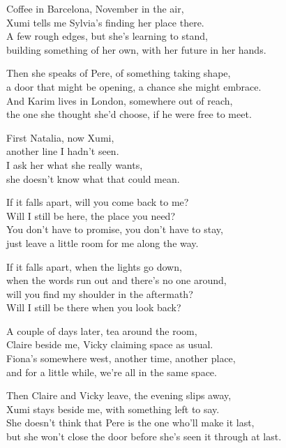 \begin{lyrics}
Coffee in Barcelona, November in the air,\\
Xumi tells me Sylvia's finding her place there.\\
A few rough edges, but she's learning to stand,\\
building something of her own, with her future in her hands.

Then she speaks of Pere, of something taking shape,\\
a door that might be opening, a chance she might embrace.\\
And Karim lives in London, somewhere out of reach,\\
the one she thought she'd choose, if he were free to meet.

First Natalia, now Xumi,\\
another line I hadn't seen.\\
I ask her what she really wants,\\
she doesn't know what that could mean.

If it falls apart, will you come back to me?\\
Will I still be here, the place you need?\\
You don't have to promise, you don't have to stay,\\
just leave a little room for me along the way.

If it falls apart, when the lights go down,\\
when the words run out and there's no one around,\\
will you find my shoulder in the aftermath?\\
Will I still be there when you look back?

A couple of days later, tea around the room,\\
Claire beside me, Vicky claiming space as usual.\\
Fiona's somewhere west, another time, another place,\\
and for a little while, we're all in the same space.

Then Claire and Vicky leave, the evening slips away,\\
Xumi stays beside me, with something left to say.\\
She doesn't think that Pere is the one who'll make it last,\\
but she won't close the door before she's seen it through at last.


\end{lyrics}

